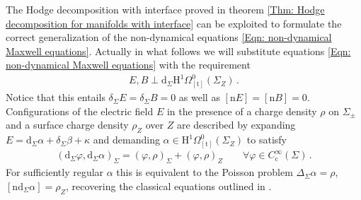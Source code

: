 \begin{remark}\label{Rmk: Hodge formulation of non-dynamical Maxwell equations}
	The Hodge decomposition with interface proved in theorem \ref{Thm: Hodge decomposition for manifolds with interface} can be exploited to formulate the correct generalization of the non-dynamical equations \eqref{Eqn: non-dynamical Maxwell equations}.
	Actually in what follows we will substitute equations \eqref{Eqn: non-dynamical Maxwell equations} with the requirement
	\begin{align}\label{Eqn: non-dynamical Maxwell equations with Hodge decomposition}
		E,B\perp\mathrm{d}_\Sigma\mathrm{H}^1\Omega^0_{[\mathrm{t}]}(\Sigma_Z)\,.
	\end{align}
	Notice that this entails $\delta_\Sigma E=\delta_\Sigma B=0$ as well as $[\mathrm{n}E]=[\mathrm{n}B]=0$.
	Configurations of the electric field $E$ in the presence of a charge density $\rho$ on $\Sigma_\pm$ and a surface charge density $\rho_Z$ over $Z$ are described by expanding $E=\mathrm{d}_\Sigma\alpha+\delta_\Sigma\beta+\kappa$ and demanding $\alpha\in\mathrm{H}^1\Omega^0_{[\mathrm{t}]}(\Sigma_Z)$ to satisfy
	\begin{align*}
		(\mathrm{d}_\Sigma\varphi,\mathrm{d}_\Sigma\alpha)_\Sigma=
		(\varphi,\rho)_\Sigma+(\varphi,\rho)_{Z}\qquad
		\forall\varphi\in C^\infty_{\mathrm{c}}(\Sigma)\,.
	\end{align*}
	For sufficiently regular $\alpha$ this is equivalent to the Poisson problem $\Delta_\Sigma\alpha=\rho$, $[\mathrm{n}\mathrm{d}_\Sigma\alpha]=\rho_Z$, recovering the classical equations outlined in \cite[Sec. I.5]{Jackson-99}.
\end{remark}

